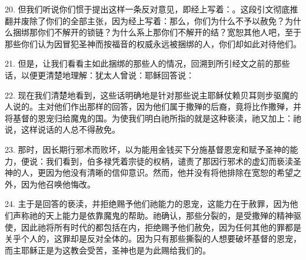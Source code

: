 \par

20. 但我们听说你们惯于提出这样一条反对意见，即经上写着：。这段引文彻底推翻并废除了你们的全部主张，因为经上写着：那么，你们为什么不予以赦免？为什么捆绑那你们不解开的锁链？为什么系上那你们不解开的结？宽恕其他人吧，至于那些你们认为因冒犯圣神而按福音的权威永远被捆绑的人，你们却如此对待他们。\par

21. 但是，让我们看看主如此捆绑的那些人的情况，回溯到所引经文之前的那些话，以便更清楚地理解：犹太人曾说：耶稣回答说：\par

22. 现在我们清楚地看到，这些话明确地是针对那些说主耶稣仗赖贝耳则步驱魔的人说的。主对他们作出那样的回答，因为他们属于撒殚的后裔，竟将比作撒殚，并将基督的恩宠归给魔鬼的国。为使我们明白祂所指的就是这种亵渎，祂又加上：祂说，这样说话的人总不得赦免。\par

23. 那时，因长期行邪术而败坏，以为能用金钱买下分施基督恩宠和赋予圣神的能力，便说：我们看到，伯多禄凭着宗徒的权柄，谴责了那因行邪术的虚幻而亵渎圣神的人，更因为他没有清晰的信仰意识。然而，他并没有将他排除在宽恕的希望之外，因为他召唤他悔改。\par

24. 主于是回答的亵渎，并拒绝赐予他们祂能力的恩宠，这能力在于赦罪，因为他们声称祂的天上能力是依靠魔鬼的帮助。祂确认，那些分裂的，是受撒殚的精神驱使，因此祂将所有时代的都包括在内，拒绝赐予他们赦免，因为任何其他的罪都是关乎个人的，这罪却是反对全体的。因为只有那些撕裂的人想要破坏基督的恩宠，而主耶稣正是为这教会受苦，圣神也是为此赐给我们的。\par

